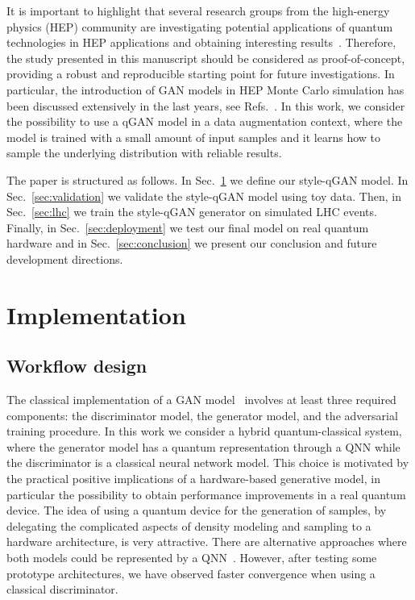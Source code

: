 \documentclass[twocolumn,preprintnumbers,superscriptaddress]{revtex4-2}
\begin{document}
It is important to highlight that several research groups from the high-energy
physics (HEP) community are investigating potential applications of quantum
technologies in HEP applications and obtaining interesting
results~\cite{P_rez_Salinas_2021,Guan_2021,chang2021quantum,Chang_2021,Belis_2021,khattak2021fast}.
Therefore, the study presented in this manuscript should be considered as
proof-of-concept, providing a robust and reproducible starting point for future
investigations. In particular, the introduction of GAN models in HEP Monte Carlo
simulation has been discussed extensively in the last years, see
Refs.~\cite{baldi2021gan,Backes_2021,butter2020generative,Butter_2021,Butter_2020,Bellagente_2020,Butter_2019}.
In this work, we consider the possibility to use a qGAN model in a data
augmentation context, where the model is trained with a small amount of input
samples and it learns how to sample the underlying distribution with reliable
results.

The paper is structured as follows. In Sec.~\ref{sec:implementation} we define our style-qGAN model. In Sec.~\ref{sec:validation} we
validate the style-qGAN model using toy data. Then, in Sec.~\ref{sec:lhc} we train the style-qGAN
generator on simulated LHC events. Finally, in Sec.~\ref{sec:deployment} we test
our final model on real quantum hardware and in Sec.~\ref{sec:conclusion} we
present our conclusion and future development directions.

\section{Implementation}
\label{sec:implementation}

\subsection{Workflow design}

The classical implementation of a GAN model~\cite{goodfellow2014generative}
involves at least three required components: the discriminator model, the
generator model, and the adversarial training procedure. In this work we
consider a hybrid quantum-classical system, where the generator model has a
quantum representation through a QNN while the
discriminator is a classical neural network model. This choice is motivated by
the practical positive implications of a hardware-based generative model, in
particular the possibility to obtain performance improvements in a real quantum
device. The idea of using a quantum device for the generation of
samples, by delegating the complicated aspects of density modeling and sampling
to a hardware architecture, is very attractive.
%
There are alternative approaches where both models could be represented by a
QNN~\cite{dallaire2018quantum, hu2019quantum, benedetti2019adversarial, romero2021variational, niu2021entangling}. However, after testing some prototype architectures, we have observed faster convergence when using a classical discriminator.
\end{document}
